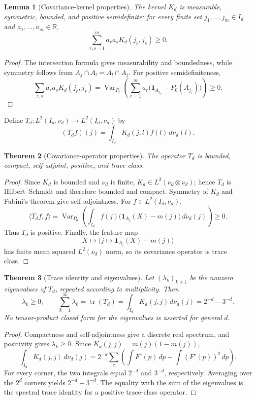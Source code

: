 \documentclass[pdflatex]{sn-jnl}
\theoremstyle{thmstyleone}
\newtheorem{theorem}{Theorem}[section]
\newtheorem{lemma}[theorem]{Lemma}
\theoremstyle{thmstyletwo}
\theoremstyle{thmstylethree}
\newcommand{\R}{\mathbb{R}}
\DeclareMathOperator{\Var}{Var}
\begin{document}
\begin{appendices}
\begin{lemma}[Covariance-kernel properties]\label{lem:kernel-symm}
The kernel $K_d$ is measurable, symmetric, bounded, and positive semidefinite: for every finite set $j_1,\dots,j_m\in I_d$ and $a_1,\dots,a_m\in\R$,
\[
  \sum_{r,s=1}^m a_ra_sK_d(j_r,j_s)\ge0.
\]
\end{lemma}

\begin{proof}
The intersection formula gives measurability and boundedness, while symmetry follows from $A_j\cap A_l=A_l\cap A_j$. For positive semidefiniteness,
\[
  \sum_{r,s}a_ra_sK_d(j_r,j_s)
  =\Var_{P_0}\!\left(\sum_{r=1}^m a_r
    \bigl(\mathbf1_{A_{j_r}}-P_0(A_{j_r})\bigr)\right)\ge0.
\]
\end{proof}

Define $T_d:L^2(I_d,\nu_d)\to L^2(I_d,\nu_d)$ by
\[
  (T_df)(j)=\int_{I_d}K_d(j,l)f(l)\,d\nu_d(l).
\]

\begin{theorem}[Covariance-operator properties]\label{thm:op-self-adjoint}
The operator $T_d$ is bounded, compact, self-adjoint, positive, and trace class.
\end{theorem}

\begin{proof}
Since $K_d$ is bounded and $\nu_d$ is finite, $K_d\in L^2(\nu_d\otimes\nu_d)$; hence $T_d$ is Hilbert--Schmidt and therefore bounded and compact. Symmetry of $K_d$ and Fubini's theorem give self-adjointness. For $f\in L^2(I_d,\nu_d)$,
\[
  \langle T_df,f\rangle
  =\Var_{P_0}\!\left(
    \int_{I_d}f(j)\bigl(\mathbf1_{A_j}(X)-m(j)\bigr)
    \,d\nu_d(j)
  \right)\ge0.
\]
Thus $T_d$ is positive. Finally, the feature map
\[
  X\longmapsto
  \bigl(j\mapsto\mathbf1_{A_j}(X)-m(j)\bigr)
\]
has finite mean squared $L^2(\nu_d)$ norm, so its covariance operator is trace class.
\end{proof}

\begin{theorem}[Trace identity and eigenvalues]\label{thm:nonneg-eigen}
Let $(\lambda_k)_{k\ge1}$ be the nonzero eigenvalues of $T_d$, repeated according to multiplicity. Then
\[
  \lambda_k\ge0,
  \qquad
  \sum_{k=1}^\infty\lambda_k
  =\operatorname{tr}(T_d)
  =\int_{I_d}K_d(j,j)\,d\nu_d(j)
  =2^{-d}-3^{-d}.
\]
No tensor-product closed form for the eigenvalues is asserted for general $d$.
\end{theorem}

\begin{proof}
Compactness and self-adjointness give a discrete real spectrum, and positivity gives $\lambda_k\ge0$. Since $K_d(j,j)=m(j)(1-m(j))$,
\[
  \int_{I_d}K_d(j,j)\,d\nu_d(j)
  =2^{-d}\sum_c\left(\int F^c(p)\,dp-\int(F^c(p))^2\,dp\right).
\]
For every corner, the two integrals equal $2^{-d}$ and $3^{-d}$, respectively. Averaging over the $2^d$ corners yields $2^{-d}-3^{-d}$. The equality with the sum of the eigenvalues is the spectral trace identity for a positive trace-class operator.
\end{proof}


\end{appendices}
\end{document}
